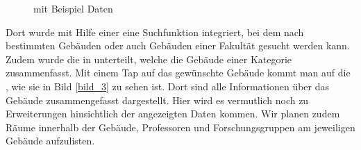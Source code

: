 \documentclass{report}
\begin{document}
\begin{figure}[ht]\label{bild_6}
\centering {}
\caption{ mit Beispiel Daten}
\end{figure}

Dort wurde mit Hilfe einer  eine Suchfunktion integriert, bei dem nach bestimmten Gebäuden oder auch Gebäuden einer Fakultät gesucht werden kann. Zudem wurde die  in  unterteilt, welche die Gebäude einer Kategorie zusammenfasst. Mit einem Tap auf das gewünschte Gebäude kommt man auf die , wie sie in Bild \ref{bild_3} zu sehen ist. Dort sind alle Informationen über das Gebäude zusammengefasst dargestellt. Hier wird es vermutlich noch zu Erweiterungen hinsichtlich der angezeigten Daten kommen. Wir planen zudem Räume innerhalb der Gebäude, Professoren und Forschungsgruppen am jeweiligen Gebäude aufzulisten.
\end{document}
